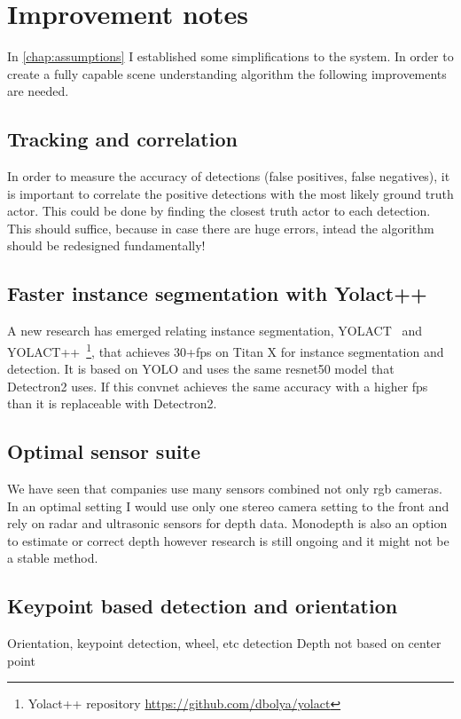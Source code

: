 \chapter{Improvement notes}
\label{chap:improvement}
In \autoref{chap:assumptions} I established some simplifications to the system.
In order to create a fully capable scene understanding algorithm the following
improvements are needed.

\section{Tracking and correlation}
In order to measure the accuracy of detections (false positives, false
negatives), it is important to correlate the positive detections with the most
likely ground truth actor. This could be done by finding the closest truth actor
to each detection. This should suffice, because in case there are huge errors,
intead the algorithm should be redesigned fundamentally!

\section{Faster instance segmentation with Yolact++}
A new research has emerged relating instance segmentation,
YOLACT~\cite{yolact-iccv2019} and YOLACT++~\cite{yolact-plus-arxiv2019}\footnote{
Yolact++ repository \url{https://github.com/dbolya/yolact}}, that achieves
30+fps on Titan X for instance segmentation and detection. It is based on YOLO
and uses the same resnet50 model that Detectron2 uses. If this convnet achieves
the same accuracy with a higher fps than it is replaceable with Detectron2.

\section{Optimal sensor suite}
We have seen that companies use many sensors combined not only rgb cameras. In
an optimal setting I would use only one stereo camera setting to the front and
rely on radar and ultrasonic sensors for depth data. Monodepth is also an option
to estimate or correct depth however research is still ongoing and it might not
be a stable method.

\section{Keypoint based detection and orientation}
Orientation, keypoint detection, wheel, etc detection
Depth not based on center point

